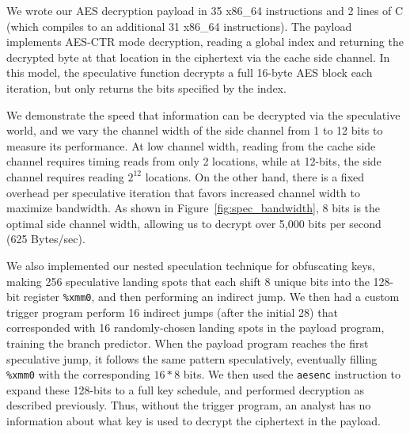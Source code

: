 We wrote our AES decryption payload in 35 x86\_64 instructions and 2 lines of C
(which compiles to an additional 31 x86\_64 instructions). The payload
implements AES-CTR mode decryption, reading a global index and returning the
decrypted byte at that location in the ciphertext via the cache side channel.
In this model, the speculative function decrypts a full 16-byte AES block each
iteration, but only returns the bits specified by the index.


We demonstrate the speed that information can be decrypted via the speculative
world, and we vary the channel width of the side channel from 1 to 12 bits to
measure its performance. At low channel width, reading from the cache side
channel requires timing reads from only 2 locations, while at 12-bits, the side
channel requires reading $2^{12}$ locations. On the other hand, there is a fixed
overhead per speculative iteration that favors increased channel width to maximize
bandwidth. As shown in Figure~\ref{fig:spec_bandwidth}, 8 bits is the optimal
side channel width, allowing us to decrypt over 5,000 bits per second (625
Bytes/sec).


\smallskip

We also implemented our nested speculation technique for obfuscating keys,
making 256 speculative landing spots that each
shift 8 unique bits into the 128-bit register \texttt{\%xmm0}, and then
performing an indirect jump. We then had a custom trigger program perform 16
indirect jumps (after the initial 28) that corresponded with 16 randomly-chosen landing spots in the
payload program, training the branch predictor. When the payload program reaches the
first speculative jump, it follows the same pattern speculatively, 
eventually filling
\texttt{\%xmm0} with the corresponding $16*8$ bits. We then used
the \texttt{aesenc} instruction to expand these 128-bits to a full
key schedule, and performed decryption as described previously. Thus, without
the trigger program, an analyst has no information about what key is used to
decrypt the ciphertext in the payload.




\FigSpecBandwidth

